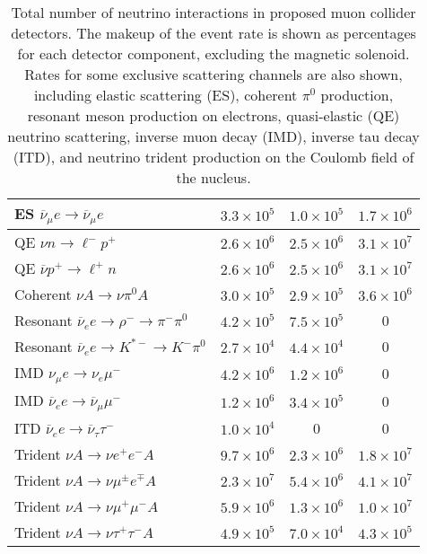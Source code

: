 \begin{table*}[t]
\begin{ruledtabular}
\begin{tabular}{lccc}
    \\
    ES $\overline\nu_{\mu} e \to \overline\nu_{\mu} e$     
    & $3.3\times 10^{5}$ & $1.0\times 10^{5}$ & $1.7\times 10^{6}$     
    \\\hline
    QE $\nu n \to \ell^- p^+$ 
    & $2.6\times 10^{6}$ & $2.5\times 10^{6}$ & $3.1\times 10^{7}$ 
    \\
    QE $\overline\nu p^+ \to \ell^+ n$ 
    & $2.6\times 10^{6}$ & $2.5\times 10^{6}$ & $3.1\times 10^{7}$ 
    \\
    Coherent $\nu A \to \nu \pi^0 A$ 
    & $3.0\times 10^{5}$ & $2.9\times 10^{5}$ & $3.6\times 10^{6}$ 
    \\
    Resonant $\overline\nu_{e} e \to \rho^- \to \pi^- \pi^0$     
    & $4.2\times 10^{5}$ & $7.5\times 10^{5}$ & 0     
    \\
    Resonant $\overline\nu_{e} e \to K^{*-} \to K^- \pi^0$     
    & $2.7\times 10^{4}$ & $4.4\times 10^{4}$ & 0     
    \\\hline
    IMD $\nu_\mu e \to \nu_e \mu^-$ 
    & $4.2\times 10^{6}$ & $1.2\times 10^{6}$ & 0 
    \\  
    IMD $\overline\nu_e e \to \overline\nu_\mu \mu^-$ 
    & $1.2\times 10^{6}$ & $3.4\times 10^{5}$ & 0 
    \\  
    ITD $\overline\nu_e e \to \overline\nu_\tau \tau^-$ 
    & $1.0\times 10^{4}$ & 0 & 0 
    \\\hline
    Trident $\nu A \to \nu e^+e^- A$ 
    & $9.7\times 10^{6}$ & $2.3\times 10^{6}$ & $1.8\times 10^{7}$ 
    \\
    Trident $\nu A \to \nu \mu^\pm e^\mp A$ 
    & $2.3\times 10^{7}$ & $5.4\times 10^{6}$ & $4.1\times 10^{7}$ 
    \\
    Trident $\nu A \to \nu \mu^+\mu^- A$ 
    & $5.9\times 10^{6}$ & $1.3\times 10^{6}$ & $1.0\times 10^{7}$ 
    \\
    Trident $\nu A \to \nu \tau^+\tau^- A$ 
    & $4.9\times 10^{5}$ & $7.0\times 10^{4}$ & $4.3\times 10^{5}$ 
    \\\hline
\end{tabular}
  \end{ruledtabular}
  \caption{Total number of neutrino interactions in proposed muon collider detectors. The makeup of the event rate is shown as percentages for each detector component, excluding the magnetic solenoid.
  Rates for some exclusive scattering channels are also shown, including elastic scattering (ES), coherent $\pi^0$ production, resonant meson production on electrons, quasi-elastic (QE) neutrino scattering, inverse muon decay (IMD), inverse tau decay (ITD), and neutrino trident production on the Coulomb field of the nucleus.}
  \label{tab:event_rate_makeup}
\end{table*}

